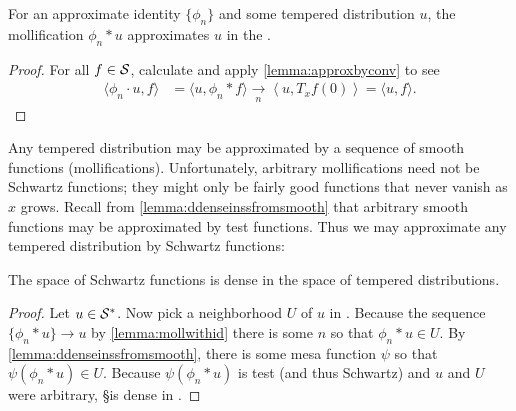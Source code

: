     \begin{lemma}
      \label{lemma:mollwithid}
      For an approximate identity $\{\phi_n\}$ and some tempered distribution $u$, the mollification $\phi_n*u$ approximates $u$ in the \ws.
    \end{lemma}
    \begin{proof}
      For all $f\in\S$, calculate and apply \cref{lemma:approxbyconv} to see
      \begin{align*}
        \langle \phi_n\cdot u, f\rangle
        &= \langle u, \phi_n*f\rangle
        \underset{n}{\longrightarrow} \left\langle u, T_xf(0) \right\rangle
        = \langle u,f\rangle \text{.}
      \end{align*}
    \end{proof}

    Any tempered distribution may be approximated by a sequence of smooth functions (mollifications).
    Unfortunately, arbitrary mollifications need not be Schwartz functions; they might only be fairly good functions that never vanish as $x$ grows.
    Recall from \cref{lemma:ddenseinssfromsmooth} that arbitrary smooth functions may be approximated by test functions.
    Thus we may approximate any tempered distribution by Schwartz functions:

    \begin{thm}
      \label{thm:sdenseinss}
      The space of Schwartz functions is dense in the space of tempered distributions.
    \end{thm}
    \begin{proof}
      Let $u\in\SS$.
      Now pick a neighborhood $U$ of $u$ in \SS.
      Because the sequence $\{\phi_n*u\}\rightarrow u$ by \cref{lemma:mollwithid} there is some $n$ so that $\phi_n*u\in U$.
      By \cref{lemma:ddenseinssfromsmooth}, there is some mesa function $\psi$ so that $\psi(\phi_n*u)\in U$.
      Because $\psi(\phi_n*u)$ is test (and thus Schwartz) and $u$ and $U$ were arbitrary, \S is dense in \SS.
    \end{proof}


